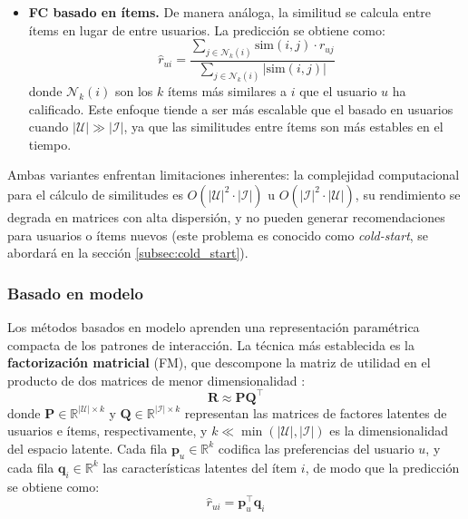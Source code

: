 \begin{itemize}
	\item \textbf{FC basado en ítems.}
	      De manera análoga, la similitud se calcula entre ítems en lugar de entre usuarios. La predicción se obtiene como:
	      \begin{equation} \label{eq:item_cf}
		      \hat{r}_{ui} = \frac{\displaystyle\sum_{j \in \mathcal{N}_k(i)} \mathrm{sim}(i, j) \cdot r_{uj}}{\displaystyle\sum_{j \in \mathcal{N}_k(i)} |\mathrm{sim}(i, j)|}
	      \end{equation}
	      donde $\mathcal{N}_k(i)$ son los $k$ ítems más similares a $i$ que el usuario $u$ ha calificado. Este enfoque tiende a ser más escalable que el basado en usuarios cuando $|\mathcal{U}| \gg |\mathcal{I}|$, ya que las similitudes entre ítems son más estables en el tiempo.

\end{itemize}

Ambas variantes enfrentan limitaciones inherentes: la complejidad computacional para el cálculo de similitudes es $O(|\mathcal{U}|^2 \cdot |\mathcal{I}|)$ u $O(|\mathcal{I}|^2 \cdot |\mathcal{U}|)$, su rendimiento se degrada en matrices con alta dispersión, y no pueden generar recomendaciones para usuarios o ítems nuevos (este problema es conocido como \textit{cold-start}, se abordará en la sección \ref{subsec:cold_start}).

\subsubsection{Basado en modelo} \label{subsubsec:cf_model}

Los métodos basados en modelo aprenden una representación paramétrica compacta de los patrones de interacción. La técnica más establecida es la \textbf{factorización matricial} (FM), que descompone la matriz de utilidad en el producto de dos matrices de menor dimensionalidad \citep{koren_matrix_2009}:
\begin{equation} \label{eq:mf}
	\mathbf{R} \approx \mathbf{P} \mathbf{Q}^\top
\end{equation}
donde $\mathbf{P} \in \mathbb{R}^{|\mathcal{U}| \times k}$ y $\mathbf{Q} \in \mathbb{R}^{|\mathcal{I}| \times k}$ representan las matrices de factores latentes de usuarios e ítems, respectivamente, y $k \ll \min(|\mathcal{U}|, |\mathcal{I}|)$ es la dimensionalidad del espacio latente. Cada fila $\mathbf{p}_u \in \mathbb{R}^k$ codifica las preferencias del usuario $u$, y cada fila $\mathbf{q}_i \in \mathbb{R}^k$ las características latentes del ítem $i$, de modo que la predicción se obtiene como:
\begin{equation} \label{eq:mf_pred}
	\hat{r}_{ui} = \mathbf{p}_u^\top \mathbf{q}_i
\end{equation}


